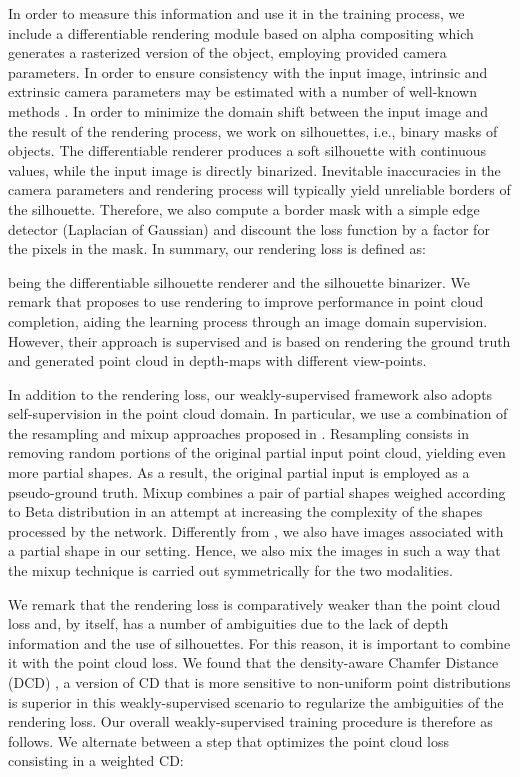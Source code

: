 \documentclass{article}
\begin{document}
In order to measure this information and use it in the training process, we include a differentiable rendering module based on alpha compositing \cite{wiles2020synsin} which generates a rasterized version of the object, employing provided camera parameters. In order to ensure consistency with the input image, intrinsic and extrinsic camera parameters may be estimated with a number of well-known methods \cite{insafutdinov18pointclouds} \cite{grabner2020geometric} \cite{palazzi2018end}. In order to minimize the domain shift between the input image and the result of the rendering process, we work on silhouettes, i.e., binary masks of objects. The differentiable renderer produces a soft silhouette with continuous values, while the input image is directly binarized. Inevitable inaccuracies in the camera parameters and rendering process will typically yield unreliable borders of the silhouette. Therefore, we also compute a border mask with a simple edge detector (Laplacian of Gaussian) and discount the loss function by a factor  for the pixels in the mask. In summary, our rendering loss is defined as:

being  the differentiable silhouette renderer and  the silhouette binarizer. 
We remark that \cite{xie2021style} proposes to use rendering to improve performance in point cloud completion, aiding the learning process through an image domain supervision. However, their approach is supervised and is based on rendering the ground truth and generated point cloud in depth-maps with different view-points.

In addition to the rendering loss, our weakly-supervised framework also adopts self-supervision in the point cloud domain. In particular, we use a combination of the resampling and mixup approaches proposed in \cite{selfsup,crn}. Resampling consists in removing random portions of the original partial input point cloud, yielding even more partial shapes. As a result, the original partial input is employed as a pseudo-ground truth. Mixup combines a pair of partial shapes weighed according to Beta distribution in an attempt at increasing the complexity of the shapes processed by the network. Differently from \cite{crn}, we also have images associated with a partial shape in our setting. Hence, we also mix the images in such a way that the mixup technique is carried out symmetrically for the two modalities.

We remark that the rendering loss is comparatively weaker than the point cloud loss and, by itself, has a number of ambiguities due to the lack of depth information and the use of silhouettes. For this reason, it is important to combine it with the point cloud loss. We found that the density-aware Chamfer Distance (DCD) \cite{balancedcd}, a version of CD that is more sensitive to non-uniform point distributions is superior in this weakly-supervised scenario to regularize the ambiguities of the rendering loss. Our overall weakly-supervised training procedure is therefore as follows. We alternate between a step that optimizes the point cloud loss consisting in a weighted CD:
\end{document}
